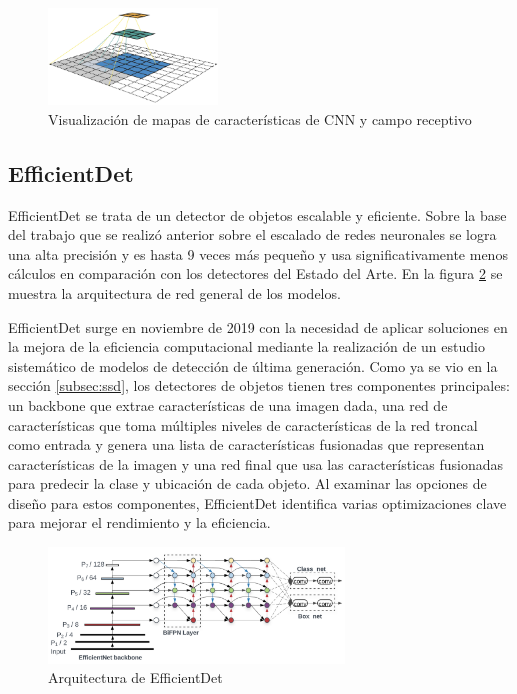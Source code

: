 \begin{figure}[ht]
\centering
\includegraphics[width=0.4\textwidth]{img/chapters/estado-del-arte/receptive-field.png}
\caption{\label{fig:receptive-field-ssd}Visualización de mapas de características de CNN y campo receptivo \cite{how-works-ssd}}
\end{figure}

\subsection{EfficientDet}
\label{subsec:efficientdet}

EfficientDet \cite{tan2020efficientdet} se trata de un detector de objetos escalable y eficiente. Sobre la base del trabajo que se realizó anterior sobre el escalado de redes neuronales se logra una alta precisión y es hasta 9 veces más pequeño y usa significativamente menos cálculos en comparación con los detectores del Estado del Arte. En la figura \ref{fig:arquitectura-efficientdet} se muestra la arquitectura de red general de los modelos.

EfficientDet surge en noviembre de 2019 con la necesidad de aplicar soluciones en la mejora de la eficiencia computacional mediante la realización de un estudio sistemático de modelos de detección de última generación. Como ya se vio en la sección \ref{subsec:ssd}, los detectores de objetos tienen tres componentes principales: un backbone que extrae características de una imagen dada, una red de características que toma múltiples niveles de características de la red troncal como entrada y genera una lista de características fusionadas que representan características de la imagen y una red final que usa las características fusionadas para predecir la clase y ubicación de cada objeto. Al examinar las opciones de diseño para estos componentes, EfficientDet identifica varias optimizaciones clave para mejorar el rendimiento y la eficiencia.

\begin{figure}[ht]
\centering
\includegraphics[width=0.7\textwidth]{img/chapters/estado-del-arte/arquitectura-efficientdet.png}
\caption{\label{fig:arquitectura-efficientdet}Arquitectura de EfficientDet \cite{tan2020efficientdet}}
\end{figure}

